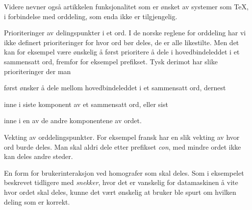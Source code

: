 Videre nevner også artikkelen funksjonalitet som er ønsket av systemer som \TeX{}, i forbindelse med orddeling, som enda ikke er tilgjengelig.

\begin{items}
\item Prioriteringer av delingspunkter i et ord. I de norske reglene for orddeling har vi ikke definert prioriteringer for hvor ord bør deles, de er alle likestilte. Men det kan for eksempel være ønskelig å først prioritere å dele i hovedbindeleddet i et sammensatt ord, fremfor for eksempel prefikset. Tysk derimot har slike prioriteringer der man 
\begin{inparaenum}
\item først ønsker å dele mellom hovedbindeleddet i et sammensatt ord, dernest 
\item inne i siste komponent av et sammensatt ord, eller sist 
\item inne i en av de andre komponentene av ordet.
\end{inparaenum}
\item Vekting av orddelingspunkter. For eksempel fransk har en slik vekting av hvor ord burde deles. Man skal aldri dele etter prefikset \textit{con}, med mindre ordet ikke kan deles andre steder.
\item En form for brukerinteraksjon ved homografer som skal deles. Som i eksempelet beskrevet tidligere med \textit{snekker}, hvor det er vanskelig for datamaskinen å vite hvor ordet skal deles, kunne det vært ønskelig at bruker ble spurt om hvilken deling som er korrekt.
\end{items}